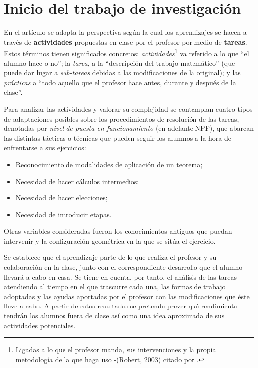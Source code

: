 \section*{Inicio del trabajo de investigación}
	En el artículo se adopta la perspectiva según la cual los aprendizajes se hacen a través de \textbf{actividades} propuestas en clase por el profesor por medio de \textbf{tareas}. Estos términos tienen significados concretos: \textit{actividades}\footnote{Ligadas a lo que el profesor manda, sus intervenciones y la propia metodología de la que haga uso -(Robert, 2003) citado por \citet{Horoks}.} va referido a lo que ``el alumno hace o no''; la \textit{tarea}, a la ``descripción del trabajo matemático'' (que puede dar lugar a \textit{sub-tareas} debidas a las modificaciones de la original); y las \textit{prácticas} a  ``todo aquello que el profesor hace antes, durante y después de la clase''. 
	
	Para analizar las actividades y valorar su complejidad se contemplan cuatro tipos de adaptaciones posibles sobre los procedimientos de resolución de las tareas, denotadas por \textit{nivel de puesta en funcionamiento} (en adelante NPF), que abarcan las distintas tácticas o técnicas que pueden seguir los alumnos a la hora de enfrentarse a sus ejercicios:
	\begin{itemize} \label{NPF}
		\item Reconocimiento de modalidades de aplicación de un teorema;
		\item Necesidad de hacer cálculos intermedios;
		\item Necesidad de hacer elecciones;
		\item Necesidad de introducir etapas.
	\end{itemize}
	
	Otras variables consideradas fueron los conocimientos antiguos que puedan intervenir y la configuración geométrica en la que se sitúa el ejercicio.		
	
	Se establece que el aprendizaje parte de lo que realiza el profesor y su colaboración en la clase, junto con el correspondiente desarrollo que el alumno llevará a cabo en casa. Se tiene en cuenta, por tanto, el análisis de las tareas atendiendo al tiempo en el que trascurre cada una, las formas de trabajo adoptadas y las ayudas aportadas por el profesor con las modificaciones que éste lleve a cabo. A partir de estos resultados se pretende prever qué rendimiento tendrán los alumnos fuera de clase así como una idea aproximada de sus actividades potenciales.

